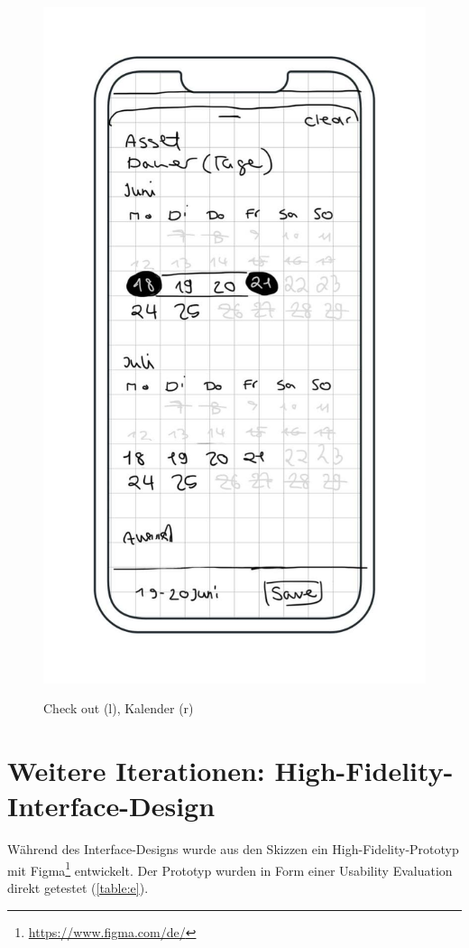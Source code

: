 \begin{figure}[h]
    \includegraphics[scale=0.3]{Bilder/Mockups/Kalender.jpg}
    \label{fig:m3}
    \caption[Mockup: Check out, Kalender]{Check out (l), Kalender (r)}
\end{figure}

\section{Weitere Iterationen: High-Fidelity-Interface-Design}
Während des Interface-Designs wurde aus den Skizzen ein High-Fidelity-Prototyp mit
Figma\footnote{\url{https://www.figma.com/de/}} entwickelt. Der Prototyp wurden in Form einer
Usability Evaluation direkt getestet (\ref{table:e}). 



